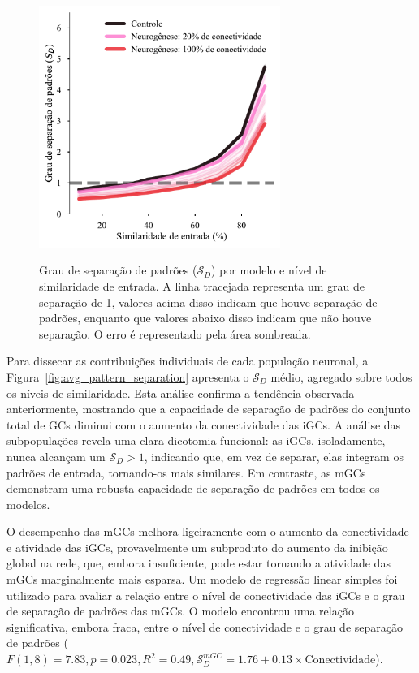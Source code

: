 \begin{figure}
    \centering
    \caption{Grau de separação de padrões ($\mathcal{S}_D$) por modelo e nível de similaridade de entrada. A linha tracejada
    representa um grau de separação de 1, valores acima disso indicam que houve separação de padrões, enquanto que valores abaixo
    disso indicam que não houve separação. O erro é representado pela área sombreada.}
    \includegraphics[width=0.7\textwidth]{figuras/plots/pattern_separation}
    \label{fig:pattern_separation}
\end{figure}

Para dissecar as contribuições individuais de cada população neuronal, a Figura~\ref{fig:avg_pattern_separation} apresenta o
$\mathcal{S}_D$ médio, agregado sobre todos os níveis de similaridade. Esta análise confirma a tendência observada anteriormente,
mostrando que a capacidade de separação de padrões do conjunto total de GCs diminui com o aumento da conectividade das iGCs. A
análise das subpopulações revela uma clara dicotomia funcional: as iGCs, isoladamente, nunca alcançam um $\mathcal{S}_D > 1$,
indicando que, em vez de separar, elas integram os padrões de entrada, tornando-os mais similares. Em contraste, as mGCs
demonstram uma robusta capacidade de separação de padrões em todos os modelos. 

O desempenho das mGCs melhora ligeiramente com o aumento da conectividade e atividade das iGCs, provavelmente um subproduto do
aumento da inibição global na rede, que, embora insuficiente, pode estar tornando a atividade das mGCs marginalmente mais esparsa.
Um modelo de regressão linear simples foi utilizado para avaliar a relação entre o nível de conectividade das iGCs e o grau de
separação de padrões das mGCs. O modelo encontrou uma relação significativa, embora fraca, entre o nível de conectividade e o grau
de separação de padrões ($F(1, 8) = 7.83, p = 0.023, R^2 = 0.49, \mathcal{S}^{mGC}_D = 1.76 + 0.13 \times \text{Conectividade}$).

